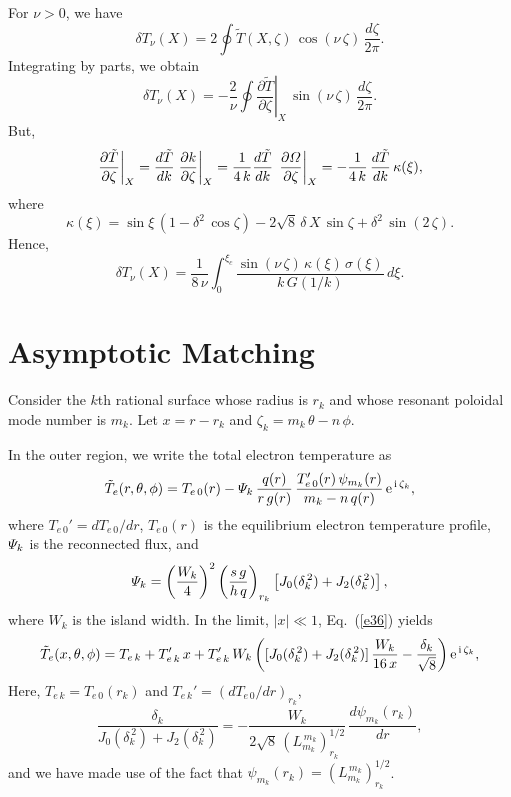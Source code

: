 \documentclass[12pt,prb,aps,notitlepage]{revtex4-1}
\begin{document}
For $\nu>0$, we have
\begin{equation}
\delta T_\nu(X) = 2\oint\tilde{T}(X,\zeta)\,\cos(\nu\,\zeta)\,\frac{d\zeta}{2\pi}.
\end{equation}
Integrating by parts, we obtain
\begin{equation}
\delta T_\nu(X) = -\frac{2}{\nu}\oint\left.\frac{\partial \tilde{T}}{\partial\zeta}\right|_X\,\sin(\nu\,\zeta)\,\frac{d\zeta}{2\pi}.
\end{equation}
But,
\begin{equation}
\left.\frac{\partial \tilde{T}}{\partial\zeta}\right|_X=\frac{d\tilde{T}}{dk}\left.\frac{\partial k}{\partial\zeta}\right|_{X}
=\frac{1}{4\,k}\frac{d\tilde{T}}{dk}\,\left.\frac{\partial {\mit\Omega}}{\partial\zeta}\right|_{X}=-\frac{1}{4\,k}\,\frac{d\tilde{T}}{dk}\,\kappa(\xi),
\end{equation}
where
\begin{equation}
\kappa(\xi) = \sin\xi\,(1-\delta^2\,\cos\zeta)  -2\sqrt{8}\,\delta\,X\,\sin\zeta +\delta^2\,\sin(2\,\zeta).
\end{equation}
Hence,
\begin{equation}
\delta T_\nu(X) =\frac{1}{8\,\nu}\int_0^{\xi_c}\frac{\sin(\nu\,\zeta)\,\kappa(\xi)\,\sigma(\xi)}{k\,G(1/k)}\,d\xi.
\end{equation}

\section{Asymptotic Matching}
Consider the $k$th rational surface whose radius is $r_k$ and whose resonant poloidal mode number is $m_k$. Let  $x=r-r_k$ and $\zeta_k=m_k\,\theta-n\,\phi$. 

 In the outer region,  we write the total electron temperature as 
\begin{equation}\label{e36}
\tilde{T}_e(r, \theta,\phi)=T_{e\,0}(r) - {\mit\Psi}_k\,\frac{q(r)}{r\,g(r)}\,\frac{T_{e\,0}'(r)\,\psi_{m_k}(r)}{m_k-n\,q(r)}\,{\rm e}^{\,{\rm i}\,\zeta_k},
\end{equation}
where $T_{e\,0}'=dT_{e\,0}/dr$, $T_{e\,0}(r)$ is the equilibrium electron temperature profile, ${\mit\Psi}_k$ is the reconnected flux, and 
\begin{equation}
{\mit\Psi}_k = \left(\frac{W_k}{4}\right)^2\left(\frac{s\,g}{h\,q}\right)_{r_k}\left[J_0(\delta_k^{\,2})+ J_2(\delta_k^{\,2})\right],
\end{equation}
where $W_k$ is the island width.
In the limit, $|x|\ll 1$, Eq.~(\ref{e36}) yields
\begin{equation}
\tilde{T}_e(x, \theta,\phi)=T_{e\,k} + T_{e\,k}'\,x + T_{e\,k}'\,W_k\left([J_0(\delta_k^{\,2})+J_2(\delta_k^{\,2})]\,\frac{W_k}{16\,x} - \frac{\delta_k}{\sqrt{8}}\right){\rm e}^{\,{\rm i}\,\zeta_k},
\end{equation}
Here, $T_{e\,k}=T_{e\,0}(r_k)$ and $T_{e\,k}'= (dT_{e\,0}/dr)_{r_k}$, 
\begin{equation}
\frac{\delta_k} {J_0(\delta_k^{\,2})+J_2(\delta_k^{\,2})}=  -\frac{W_k}{2\sqrt{8}\,(L_{m_k}^{\,m_k})^{1/2}_{r_k}}\,\frac{d\psi_{m_k}(r_k)}{dr},
\end{equation}
and we have made use of the fact that $\psi_{m_k}(r_k)=(L_{m_k}^{\,m_k})^{1/2}_{r_k}$. 
\end{document}
